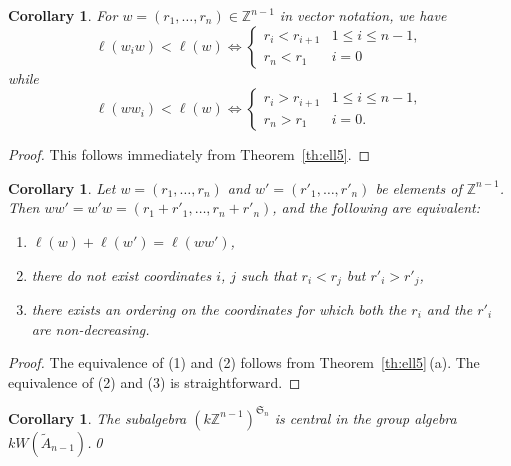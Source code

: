 \documentclass[12pt]{amsart}
\renewcommand{\le}{\leqslant}
\newcommand{\sym}[1]{\mathfrak{S}_{#1}}
\newcommand{\bZ}{{\mathbb{Z}}}
\numberwithin{equation}{section}
\newtheorem{corollary}[equation]{Corollary}
\theoremstyle{definition}
\begin{document}
\begin{corollary}\label{co:ell6}
For $w=(r_1,\dots,r_n)\in\bZ^{n-1}$ in vector notation, we have
\[ \ell(w_iw)<\ell(w) \Longleftrightarrow 
\begin{cases} 
r_i<r_{i+1}& 1\le i\le n-1,\\
r_n<r_1 & i=0
\end{cases} \]
while
\[ \ell(ww_i)<\ell(w)\Longleftrightarrow
\begin{cases}
r_i>r_{i+1}&1\le i\le n-1,\\
r_n>r_1&i=0.
\end{cases} \]
\end{corollary}
\begin{proof}
This follows immediately from Theorem~\ref{th:ell5}.
\end{proof}

\begin{corollary}\label{co:ellZ}
Let $w=(r_1,\dots,r_n)$ and $w'=(r'_1,\dots,r'_n)$ be elements of
$\bZ^{n-1}$. Then $ww'=w'w=(r_1+r'_1,\dots,r_n+r'_n)$, and the
following are equivalent:
\begin{enumerate}
\item $\ell(w)+\ell(w')=\ell(ww')$,
\item there do not exist coordinates $i$, $j$ such that $r_i<r_j$ but
  $r'_i>r'_j$, 
\item there exists an ordering on the coordinates for which both the
  $r_i$ and the $r'_i$ are non-decreasing.
\end{enumerate}
\end{corollary}
\begin{proof}
The equivalence of (1) and (2) follows from
Theorem~\ref{th:ell5}\,(a). The equivalence of (2) and (3) is straightforward.
\end{proof}

\begin{corollary}
The subalgebra $(k\bZ^{n-1})^{\sym{n}}$ is central in the group
algebra $kW(\tilde A_{n-1})$.\hfill\qed
\end{corollary}
\end{document}
